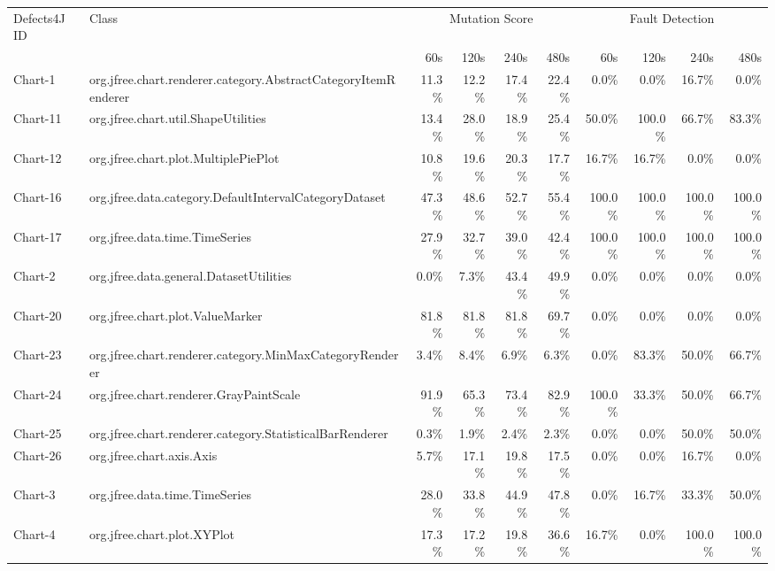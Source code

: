\begin{tabular}{ ll rrrr rrrr}\toprule 
 Defects4J ID & Class &  \multicolumn{4}{c}{Mutation Score}  &  \multicolumn{4}{c}{Fault Detection} \\ 
 & & 60s & 120s & 240s & 480s & 60s & 120s & 240s & 480s \\ 
\midrule 
Chart-1 &  org.jfree.chart.renderer.category.AbstractCategoryItemRenderer &  11.3\% &  12.2\% &  17.4\% &  22.4\% &  0.0\% &  0.0\% &  16.7\% &  0.0\%\\ 
Chart-11 &  org.jfree.chart.util.ShapeUtilities &  13.4\% &  28.0\% &  18.9\% &  25.4\% &  50.0\% &  100.0\% &  66.7\% &  83.3\%\\ 
Chart-12 &  org.jfree.chart.plot.MultiplePiePlot &  10.8\% &  19.6\% &  20.3\% &  17.7\% &  16.7\% &  16.7\% &  0.0\% &  0.0\%\\ 
Chart-16 &  org.jfree.data.category.DefaultIntervalCategoryDataset &  47.3\% &  48.6\% &  52.7\% &  55.4\% &  100.0\% &  100.0\% &  100.0\% &  100.0\%\\ 
Chart-17 &  org.jfree.data.time.TimeSeries &  27.9\% &  32.7\% &  39.0\% &  42.4\% &  100.0\% &  100.0\% &  100.0\% &  100.0\%\\ 
Chart-2 &  org.jfree.data.general.DatasetUtilities &  0.0\% &  7.3\% &  43.4\% &  49.9\% &  0.0\% &  0.0\% &  0.0\% &  0.0\%\\ 
Chart-20 &  org.jfree.chart.plot.ValueMarker &  81.8\% &  81.8\% &  81.8\% &  69.7\% &  0.0\% &  0.0\% &  0.0\% &  0.0\%\\ 
Chart-23 &  org.jfree.chart.renderer.category.MinMaxCategoryRenderer &  3.4\% &  8.4\% &  6.9\% &  6.3\% &  0.0\% &  83.3\% &  50.0\% &  66.7\%\\ 
Chart-24 &  org.jfree.chart.renderer.GrayPaintScale &  91.9\% &  65.3\% &  73.4\% &  82.9\% &  100.0\% &  33.3\% &  50.0\% &  66.7\%\\ 
Chart-25 &  org.jfree.chart.renderer.category.StatisticalBarRenderer &  0.3\% &  1.9\% &  2.4\% &  2.3\% &  0.0\% &  0.0\% &  50.0\% &  50.0\%\\ 
Chart-26 &  org.jfree.chart.axis.Axis &  5.7\% &  17.1\% &  19.8\% &  17.5\% &  0.0\% &  0.0\% &  16.7\% &  0.0\%\\ 
Chart-3 &  org.jfree.data.time.TimeSeries &  28.0\% &  33.8\% &  44.9\% &  47.8\% &  0.0\% &  16.7\% &  33.3\% &  50.0\%\\ 
Chart-4 &  org.jfree.chart.plot.XYPlot &  17.3\% &  17.2\% &  19.8\% &  36.6\% &  16.7\% &  0.0\% &  100.0\% &  100.0\%\\ 

\end{tabular}
